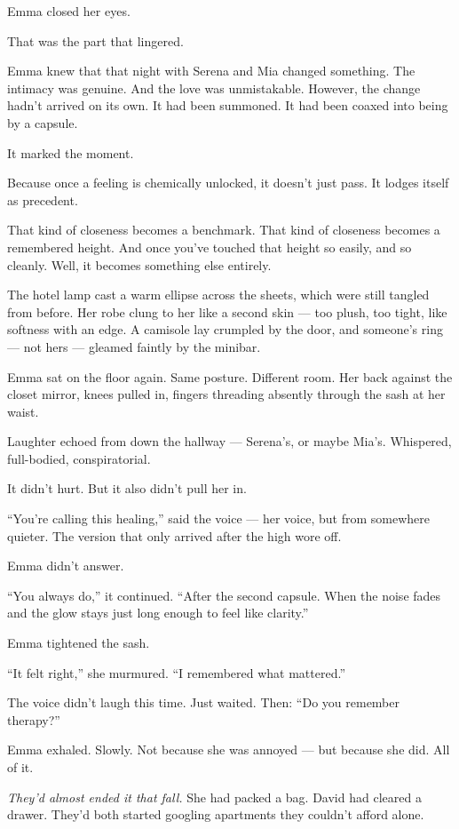 Emma closed her eyes.

That was the part that lingered.

Emma knew that that night with Serena and Mia changed something.
The intimacy was genuine. 
And the love was unmistakable. 
However, the change hadn’t arrived on its own. 
It had been summoned. 
It had been coaxed into being by a capsule.

It marked the moment.

Because once a feeling is chemically unlocked, it doesn’t just pass.
It lodges itself as precedent.

That kind of closeness becomes a benchmark. 
That kind of closeness becomes a remembered height.
And once you've touched that height so easily, and so cleanly. 
Well, it becomes something else entirely.

The hotel lamp cast a warm ellipse across the sheets, which were still tangled from before. Her 
robe clung to her like a second skin — too plush, too tight, like softness with an edge. A camisole 
lay crumpled by the door, and someone’s ring — not hers — gleamed faintly by the minibar.

Emma sat on the floor again. Same posture. Different room. Her back against the closet mirror, 
knees pulled in, fingers threading absently through the sash at her waist.

Laughter echoed from down the hallway — Serena’s, or maybe Mia’s. Whispered, full-bodied, 
conspiratorial.

It didn’t hurt.
But it also didn’t pull her in.

``You’re calling this healing,'' said the voice — her voice, but from somewhere quieter. The version 
that only arrived after the high wore off.

Emma didn’t answer.

``You always do,'' it continued. ``After the second capsule. When the noise fades and the glow stays 
just long enough to feel like clarity.''

Emma tightened the sash.

``It felt right,'' she murmured. ``I remembered what mattered.''

The voice didn’t laugh this time. Just waited. Then:
``Do you remember therapy?''

Emma exhaled. Slowly.
Not because she was annoyed — but because she did. All of it.

\textit{They’d almost ended it that fall.}
She had packed a bag.
David had cleared a drawer.
They’d both started googling apartments they couldn’t afford alone.


